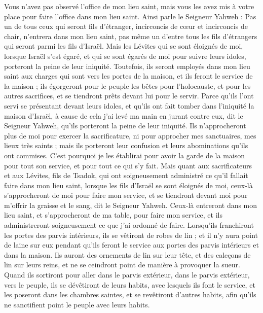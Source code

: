 \begin{multicols}{2}
Vous n'avez pas observé l’office de mon lieu saint, mais vous les avez mis à votre place pour faire l’office dans mon lieu saint.
Ainsi parle le Seigneur Yahweh : Pas un de tous ceux qui seront fils d'étranger, incirconcis de cœur et incirconcis de chair, n'entrera dans mon lieu saint, pas même un d'entre tous les fils d'étrangers qui seront parmi les fils d'Israël.
Mais les Lévites qui se sont éloignés de moi, lorsque Israël s'est égaré, et qui se sont égarés de moi pour suivre leurs idoles, porteront la peine de leur iniquité.
Toutefois, ils seront employés dans mon lieu saint aux charges qui sont vers les portes de la maison, et ils feront le service de la maison ; ils égorgeront pour le peuple les bêtes pour l'holocauste, et pour les autres sacrifices, et se tiendront prêts devant lui pour le servir.
Parce qu'ils l’ont servi se présentant devant leurs idoles, et qu'ils ont fait tomber dans l’iniquité la maison d'Israël, à cause de cela j'ai levé ma main en jurant contre eux, dit le Seigneur Yahweh, qu'ils porteront la peine de leur iniquité.
Ils n'approcheront plus de moi pour exercer la sacrificature, ni pour approcher mes sanctuaires, mes lieux très saints ; mais ils porteront leur confusion et leurs abominations qu’ils ont commises.
C'est pourquoi je les établirai pour avoir la garde de la maison pour tout son service, et pour tout ce qui s'y fait.
Mais quant aux sacrificateurs et aux Lévites, fils de Tsadok, qui ont soigneusement administré ce qu'il fallait faire dans mon lieu saint, lorsque les fils d'Israël se sont éloignés de moi, ceux-là s'approcheront de moi pour faire mon service, et se tiendront devant moi pour m'offrir la graisse et le sang, dit le Seigneur Yahweh.
Ceux-là entreront dans mon lieu saint, et s'approcheront de ma table, pour faire mon service, et ils administreront soigneusement ce que j'ai ordonné de faire.
Lorsqu’ils franchiront les portes des parvis intérieurs, ils se vêtiront de robes de lin ; et il n'y aura point de laine sur eux pendant qu'ils feront le service aux portes des parvis intérieurs et dans la maison.
Ils auront des ornements de lin sur leur tête, et des caleçons de lin sur leurs reins, et ne se ceindront point de manière à provoquer la sueur.
Quand ils sortiront pour aller dans le parvis extérieur, dans le parvis extérieur, vers le peuple, ils se dévêtiront de leurs habits, avec lesquels ils font le service, et les poseront dans les chambres saintes, et se revêtiront d'autres habits, afin qu'ils ne sanctifient point le peuple avec leurs habits.

\end{multicols}
